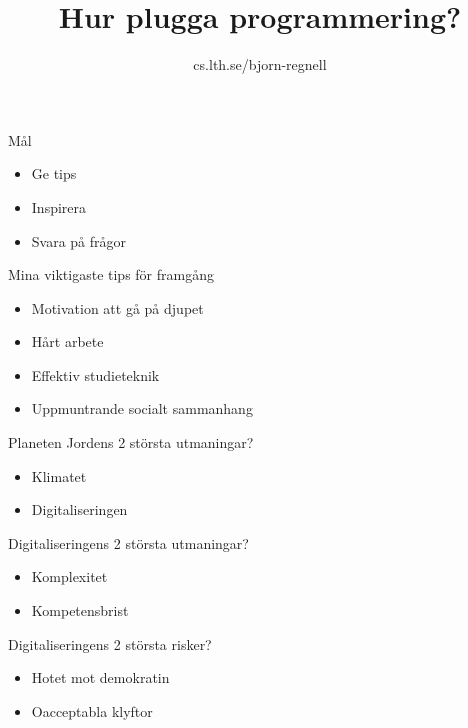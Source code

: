\documentclass{lecturesimple}
\title{Hur plugga programmering?}
\author{cs.lth.se/bjorn-regnell}
\institute{}
\date{\DateOfShow}
\begin{document}
\frame{\titlepage}

\begin{Slide}{Mål}
  \begin{itemize}
    \item Ge tips
    \item Inspirera
    \item Svara på frågor
  \end{itemize}
\end{Slide}

\begin{Slide}{Mina viktigaste tips för framgång}
  \begin{itemize}
    \item Motivation att gå på djupet
    \item Hårt arbete
    \item Effektiv studieteknik
    \item Uppmuntrande socialt sammanhang
  \end{itemize}  
\end{Slide}


\begin{Slide}{Planeten Jordens 2 största utmaningar?}
  \begin{itemize}
    \item Klimatet
    \item Digitaliseringen 
  \end{itemize}
\end{Slide}

\begin{Slide}{Digitaliseringens 2 största utmaningar?}
  \begin{itemize}
    \item Komplexitet
    \item Kompetensbrist 
  \end{itemize}  
\end{Slide}



\begin{Slide}{Digitaliseringens 2 största risker?}
  \begin{itemize}
    \item Hotet mot demokratin
    \item Oacceptabla klyftor
  \end{itemize}  
\end{Slide}
\end{document}
